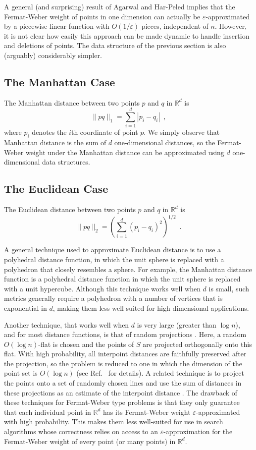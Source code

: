 \documentclass[charterfonts,lotsofwhite]{patmorin}
\newcommand{\eps}{\varepsilon}
\newcommand{\Real}{\mathbb{R}}
\begin{document}
\begin{rem} 
A general (and surprising) result of Agarwal and Har-Peled \cite{ah01}
implies that the Fermat-Weber weight of points in one dimension can
actually be $\eps$-approximated by a piecewise-linear function with
$O(1/\eps)$ pieces, independent of $n$.  However, it is not clear how 
easily this approach
can be made dynamic to handle insertion and deletions of points. 
The data structure of the previous section is also (arguably)
considerably simpler.
\end{rem}

\subsection{The Manhattan Case}

The Manhattan distance between two points $p$ and $q$ in $\Real^d$ is
\[
\|pq\|_1 = \sum_{i=1}^d |p_i-q_i| \enspace ,
\]
where $p_i$ denotes the $i$th coordinate of point $p$.  We simply
observe that Manhattan distance is the sum of $d$ one-dimensional
distances, so the Fermat-Weber weight under the Manhattan distance can
be approximated using $d$ one-dimensional data structures.

\subsection{The Euclidean Case}

The Euclidean distance between two points $p$ and $q$ in $\Real^d$ is
\[
\|pq\|_2 = \left(\sum_{i=1}^d (p_i-q_i)^2\right)^{1/2} \enspace .
\]

A general technique used to approximate Euclidean distance is to use a
polyhedral distance function, in which the unit sphere is replaced
with a polyhedron that closely resembles a sphere.  For example, the
Manhattan distance function is a polyhedral distance function in which
the unit sphere is replaced with a unit hypercube.  Although this
technique works well when $d$ is small, such metrics generally require
a polyhedron with a number of vertices that is exponential in $d$,
making them less well-suited for high dimensional applications.

Another technique, that works well when $d$ is very large (greater
than $\log n$), and for most distance functions, is that of random
projections \cite{i01}. Here, a random $O(\log n)$-flat is chosen and
the points of $S$ are projected orthogonally onto this flat.  With
high probability, all interpoint distances are faithfully preserved
after the projection, so the problem is reduced to one in which the
dimension of the point set is $O(\log n)$ (see
Ref.~\cite[Lemma~3]{i01} for details).  A related technique is to
project the points onto a set of randomly chosen lines and use the sum
of distances in these projections as an estimate of the interpoint
distance \cite{k97}.  The drawback of these techniques for
Fermat-Weber type problems is that they only guarantee that each
individual point in $\mathbb{R}^d$ has its Fermat-Weber weight
$\eps$-approximated with high probability.  This makes them less
well-suited for use in search algorithms whose correctness relies on
access to an $\eps$-approximation for the Fermat-Weber weight of every
point (or many points) in $\mathbb{R}^d$.
\end{document}

